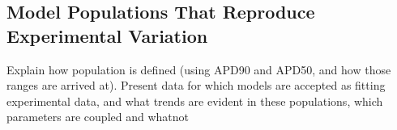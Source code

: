 \documentclass[../thesis-main.tex]{subfiles}
\begin{document}
 \subsection{Model Populations That Reproduce Experimental Variation}
 \label{subsec:population-trends}
 Explain how population is defined (using APD90 and APD50, and how those ranges are arrived at). Present data for which models are accepted as fitting experimental data, and what trends are evident in these populations, \eg{} which parameters are coupled and whatnot

 

 \biblio
 
 
\end{document}
